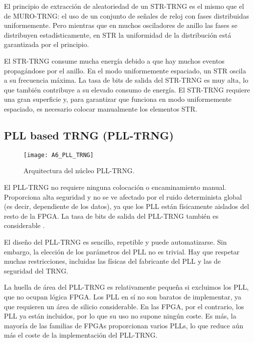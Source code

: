                 El principio de extracción de aleatoriedad de un STR-TRNG es el mismo que el de MURO-TRNG: el uso de un conjunto de señales de reloj con fases distribuidas uniformemente. Pero mientras que en muchos osciladores de anillo las fases se distribuyen estadísticamente, en STR la uniformidad de la distribución está garantizada por el principio. 

                El STR-TRNG consume mucha energía debido a que hay muchos eventos propagándose por el anillo. En el modo uniformemente espaciado, un STR oscila a su frecuencia máxima. La tasa de bits de salida del STR-TRNG es muy alta, lo que también contribuye a su elevado consumo de energía. El STR-TRNG requiere una gran superficie y, para garantizar que funciona en modo uniformemente espaciado, es necesario colocar manualmente los elementos STR.
				
				
		\subsection{PLL based TRNG (PLL-TRNG)}
				
				\begin{figure}[hbtp]
					\caption{Arquitectura del núcleo PLL-TRNG.}
					\centering
					\texttt{[image: A6\_PLL\_TRNG]}
					\label{fig:A6_PLL_TRNG}
				\end{figure}

                El PLL-TRNG no requiere ninguna colocación o encaminamiento manual. Proporciona alta seguridad y no se ve afectado por el ruido determinista global (es decir, dependiente de los datos), ya que los PLL están físicamente aislados del resto de la FPGA. La tasa de bits de salida del PLL-TRNG también es considerable \cite{Fischer2019}.

                El diseño del PLL-TRNG es sencillo, repetible y puede automatizarse. Sin embargo, la elección de los parámetros del PLL no es trivial. Hay que respetar muchas restricciones, incluidas las físicas del fabricante del PLL  y las de seguridad del TRNG. 

                La huella de área del PLL-TRNG es relativamente pequeña si excluimos los PLL, que no ocupan lógica FPGA. Los PLL en sí no son baratos de implementar, ya que requieren un área de silicio considerable. En las FPGA, por el contrario, los PLL ya están incluidos, por lo que su uso no supone ningún coste. Es más, la mayoría de las familias de FPGAs proporcionan varios PLLs, lo que reduce aún más el coste de la implementación del PLL-TRNG.

